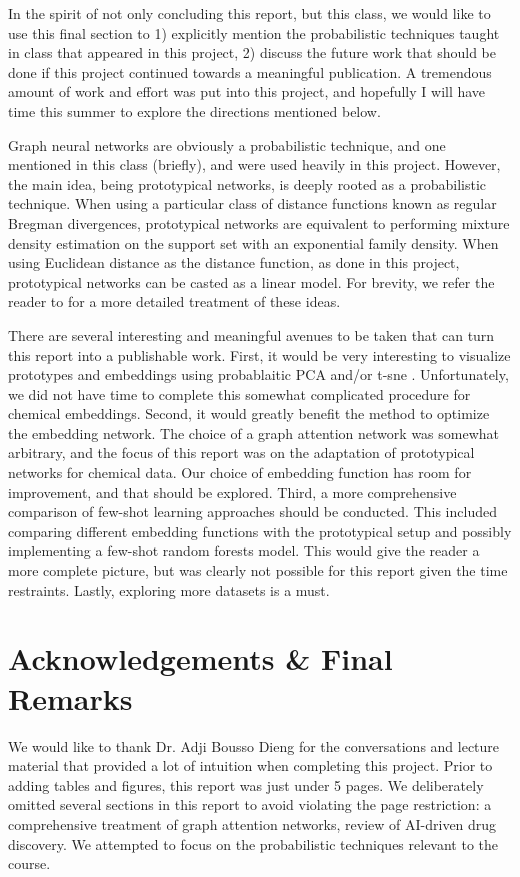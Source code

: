 \documentclass{article}
\begin{document}
In the spirit of not only concluding this report, but this class, we would like to use this final section to 1) explicitly mention the probabilistic techniques taught in class that appeared in this project, 2) discuss the future work that should be done if this project continued towards a meaningful publication.  A tremendous amount of work and effort was put into this project, and hopefully I will have time this summer to explore the directions mentioned below.


Graph neural networks are obviously a probabilistic technique, and one mentioned in this class (briefly), and were used heavily in this project.  However, the main idea, being prototypical networks, is deeply rooted as a probabilistic technique.  When using a particular class of distance functions known as regular Bregman divergences, prototypical networks are equivalent to performing mixture density estimation on the support set with an exponential family density.  When using Euclidean distance as the distance function, as done in this project, prototypical networks can be casted as a linear model.  For brevity, we refer the reader to \cite{DBLP:journals/corr/SnellSZ17} for a more detailed treatment of these ideas.


There are several interesting and meaningful avenues to be taken that can turn this report into a publishable work.  First, it would be very interesting to visualize prototypes and embeddings using probablaitic PCA \cite{tipping1999probabilistic} and/or t-sne \cite{van2008visualizing}.  Unfortunately, we did not have time to complete this somewhat complicated procedure for chemical embeddings.  Second, it would greatly benefit the method to optimize the embedding network.  The choice of a graph attention network was somewhat arbitrary, and the focus of this report was on the adaptation of prototypical networks for chemical data.  Our choice of embedding function has room for improvement, and that should be explored.  Third, a more comprehensive comparison of few-shot learning approaches should be conducted.  This included comparing different embedding functions with the prototypical setup and possibly implementing a few-shot random forests model.  This would give the reader a more complete picture, but was clearly not possible for this report given the time restraints.  Lastly, exploring more datasets is a must.  

\section*{Acknowledgements \& Final Remarks}
We would like to thank Dr. Adji Bousso Dieng for the conversations and lecture material that provided a lot of intuition when completing this project.  Prior to adding tables and figures, this report was just under 5 pages.  We deliberately omitted several sections in this report to avoid violating the page restriction: a comprehensive treatment of graph attention networks, review of AI-driven drug discovery.  We attempted to focus on the probabilistic techniques relevant to the course.  



\end{document}
